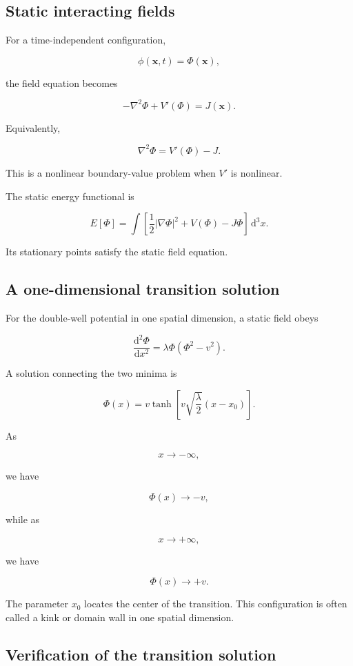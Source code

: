 \subsection{Static interacting fields}

For a time-independent configuration,

\[
\phi(\mathbf{x},t)=\Phi(\mathbf{x}),
\]

the field equation becomes

\[
\boxed{
-\nabla^{2}\Phi
+
V'(\Phi)
=
J(\mathbf{x})
}.
\]

Equivalently,

\[
\nabla^{2}\Phi
=
V'(\Phi)-J.
\]

This is a nonlinear boundary-value problem when \(V'\) is nonlinear.

The static energy functional is

\[
\boxed{
E[\Phi]
=
\int
\left[
\frac{1}{2}|\nabla\Phi|^{2}
+
V(\Phi)
-
J\Phi
\right]
\,\mathrm{d}^{3}x
}.
\]

Its stationary points satisfy the static field equation.

\subsection{A one-dimensional transition solution}

For the double-well potential in one spatial dimension, a static field obeys

\[
\frac{\mathrm{d}^{2}\Phi}{\mathrm{d}x^{2}}
=
\lambda\Phi
(\Phi^{2}-v^{2}).
\]

A solution connecting the two minima is

\[
\boxed{
\Phi(x)
=
v\tanh
\left[
v\sqrt{
\frac{\lambda}{2}
}
(x-x_{0})
\right]
}.
\]

As

\[
x\to-\infty,
\]

we have

\[
\Phi(x)\to-v,
\]

while as

\[
x\to+\infty,
\]

we have

\[
\Phi(x)\to+v.
\]

The parameter \(x_{0}\) locates the center of the transition. This configuration is often called a kink or domain wall in one spatial dimension.

\subsection{Verification of the transition solution}

